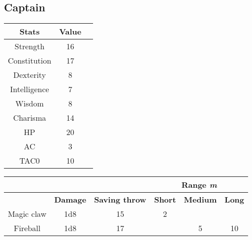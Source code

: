 \subsection{Captain}
\begin{table}[H]
  \centering
\begin{tabular}{|c|c|c|}
\hline
\rowcolor[HTML]{C0C0C0} 
\textbf{Stats} & \textbf{Value } \\ \hline
Strength & 16  \\ \hline
Constitution & 17  \\ \hline
Dexterity & 8  \\ \hline
Intelligence & 7 \\ \hline
Wisdom & 8  \\ \hline
Charisma & 14  \\ \hline
HP & 20  \\ \hline
AC & 3 \\ \hline
TAC0 & 10 \\ \hline
\end{tabular}
\end{table}
\begin{table}[H]
\centering
 \begin{tabular}{lll|c|c|c|}
\cline{4-6}
 &  & & \multicolumn{3}{c|}{\cellcolor[HTML]{C0C0C0}\textbf{Range \textit{m}}} \\ \hline
\rowcolor[HTML]{C0C0C0} 
\multicolumn{1}{|l|}{\cellcolor[HTML]{C0C0C0}\textbf{Weapon}} & \textbf{Damage} & \textbf{Saving throw}&\multicolumn{1}{l|}{\cellcolor[HTML]{C0C0C0}\textbf{Short}} & \textbf{Medium} & \textbf{Long} \\ \hline
\multicolumn{1}{|c|}{Magic claw} & \multicolumn{1}{c|}{1d8} & \multicolumn{1}{c|}{15} & 2 &  &  \\ \hline
\multicolumn{1}{|c|}{Fireball} & \multicolumn{1}{c|}{1d8} & \multicolumn{1}{c|}{17}   &  & 5 & 10 \\ \hline
\end{tabular}
  \end{table}
